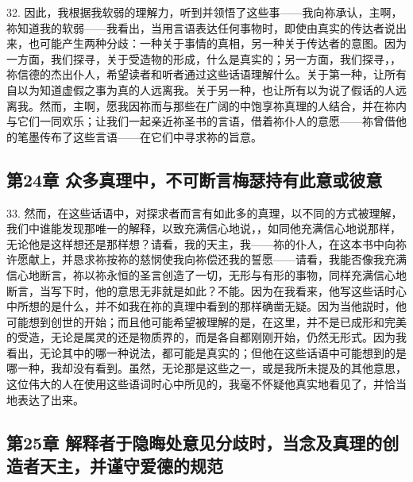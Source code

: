 32. 因此，我根据我软弱的理解力，听到并领悟了这些事——我向祢承认，主啊，祢知道我的软弱——我看出，当用言语表达任何事物时，即使由真实的传达者说出来，也可能产生两种分歧：一种关于事情的真相，另一种关于传达者的意图。因为一方面，我们探寻，关于受造物的形成，什么是真实的；另一方面，我们探寻，，祢信德的杰出仆人，希望读者和听者通过这些话语理解什么。关于第一种，让所有自以为知道虚假之事为真的人远离我。关于另一种，也让所有以为说了假话的人远离我。然而，主啊，愿我因祢而与那些在广阔的中饱享祢真理的人结合，并在祢内与它们一同欢乐；让我们一起亲近祢圣书的言语，借着祢仆人的意愿——祢曾借他的笔墨传布了这些言语——在它们中寻求祢的旨意。\par


\subsection{第24章 众多真理中，不可断言梅瑟持有此意或彼意}

33. 然而，在这些话语中，对探求者而言有如此多的真理，以不同的方式被理解，我们中谁能发现那唯一的解释，以致充满信心地说，，如同他充满信心地说那样，无论他是这样想还是那样想？请看，我的天主，我——祢的仆人，在这本书中向祢许愿献上，并恳求祢按祢的慈悯使我向祢偿还我的誓愿——请看，我能否像我充满信心地断言，祢以祢永恒的圣言创造了一切，无形与有形的事物，同样充满信心地断言，当写下时，他的意思无非就是如此？不能。因为在我看来，他写这些话时心中所想的是什么，并不如我在祢的真理中看到的那样确凿无疑。因为当他説时，他可能想到创世的开始；而且他可能希望被理解的是，在这里，并不是已成形和完美的受造，无论是属灵的还是物质界的，而是各自都刚刚开始，仍然无形式。因为我看出，无论其中的哪一种说法，都可能是真实的；但他在这些话语中可能想到的是哪一种，我却没有看到。虽然，无论那是这些之一，或是我所未提及的其他意思，这位伟大的人在使用这些语词时心中所见的，我毫不怀疑他真实地看见了，并恰当地表达了出来。\par


\subsection{第25章 解释者于隐晦处意见分歧时，当念及真理的创造者天主，并谨守爱德的规范}

